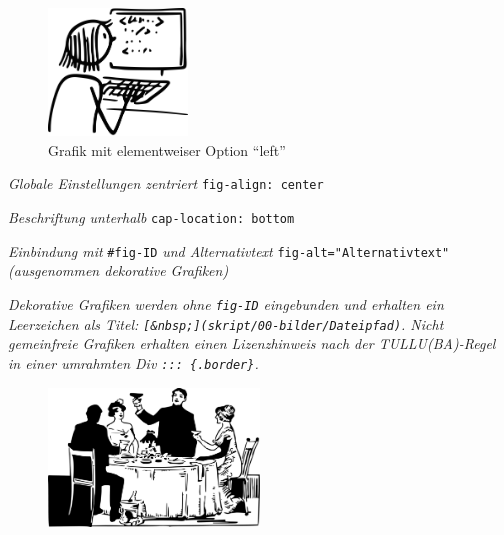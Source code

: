 \documentclass[
  letterpaper,
  DIV=11]{scrartcl}
\providecommand{\tightlist}{%
  \setlength{\itemsep}{0pt}\setlength{\parskip}{0pt}}\usepackage{longtable,booktabs,array}
\begin{document}
\begin{figure}

\includegraphics[width=0.33\textwidth,height=\textheight]{skript/00-bilder/working_code_CC0.png}

\caption{\label{fig-Grafik-mit-Optionen}Grafik mit elementweiser Option
``left''}

\end{figure}%

\begin{description}
\tightlist
\item[Grafiken]
\emph{Globale Einstellungen zentriert} \texttt{fig-align:\ center}

\emph{Beschriftung unterhalb} \texttt{cap-location:\ bottom}

\emph{Einbindung mit} \texttt{\#fig-ID} \emph{und Alternativtext}
\texttt{fig-alt="Alternativtext"} \emph{(ausgenommen dekorative
Grafiken)}
\end{description}

\emph{Dekorative Grafiken werden ohne \texttt{fig-ID} eingebunden und
erhalten ein Leerzeichen als Titel:
\texttt{{[}\&nbsp;{]}(skript/00-bilder/Dateipfad)}. Nicht gemeinfreie
Grafiken erhalten einen Lizenzhinweis nach der TULLU(BA)-Regel in einer
umrahmten Div \texttt{:::\ \{.border\}}.}

\begin{figure}[H]

{\centering \includegraphics[width=0.5\textwidth,height=\textheight]{bcd-styleguide_files/mediabag/skript/00-bilder/festmahl-PCL.pdf}

}

\caption{~}

\end{figure}%
\end{document}
